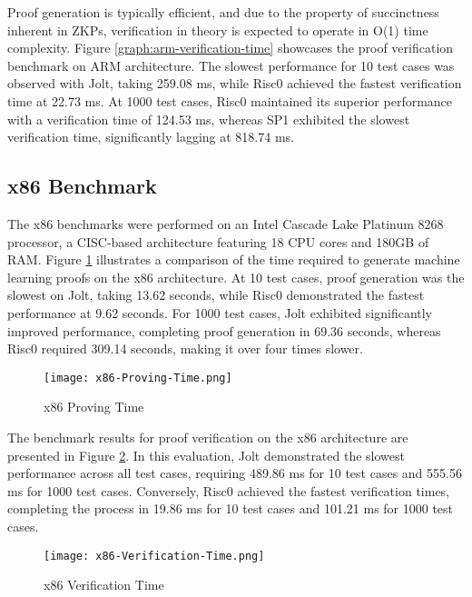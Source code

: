 \documentclass{scrartcl}
\begin{document}
Proof generation is typically efficient, and due to the property of succinctness inherent in ZKPs, verification in theory is expected to operate in  O(1) time complexity. Figure \ref{graph:arm-verification-time} showcases the proof verification benchmark on ARM architecture. The slowest performance for 10 test cases was observed with Jolt, taking 259.08 ms, while Risc0 achieved the fastest verification time at 22.73 ms. At 1000 test cases, Risc0 maintained its superior performance with a verification time of 124.53 ms, whereas SP1 exhibited the slowest verification time, significantly lagging at 818.74 ms.

\subsection{x86 Benchmark}

The x86 benchmarks were performed on an Intel Cascade Lake Platinum 8268 processor, a CISC-based architecture featuring 18 CPU cores and 180GB of RAM. Figure \ref{graph:x86-proving-time} illustrates a comparison of the time required to generate machine learning proofs on the x86 architecture. At 10 test cases, proof generation was the slowest on Jolt, taking 13.62 seconds, while Risc0 demonstrated the fastest performance at 9.62 seconds. For 1000 test cases, Jolt exhibited significantly improved performance, completing proof generation in 69.36 seconds, whereas Risc0 required 309.14 seconds, making it over four times slower.

\begin{figure}
	\begin{center}
		\texttt{[image: x86-Proving-Time.png]}
	\end{center}
	\caption{x86 Proving Time}
	\label{graph:x86-proving-time}
\end{figure}

The benchmark results for proof verification on the x86 architecture are presented in Figure \ref{graph:x86-verification-time}. In this evaluation, Jolt demonstrated the slowest performance across all test cases, requiring 489.86 ms for 10 test cases and 555.56 ms for 1000 test cases. Conversely, Risc0 achieved the fastest verification times, completing the process in 19.86 ms for 10 test cases and 101.21 ms for 1000 test cases.

\begin{figure}
	\begin{center}
		\texttt{[image: x86-Verification-Time.png]}
	\end{center}
	\caption{x86 Verification Time}
	\label{graph:x86-verification-time}
\end{figure}
\end{document}
